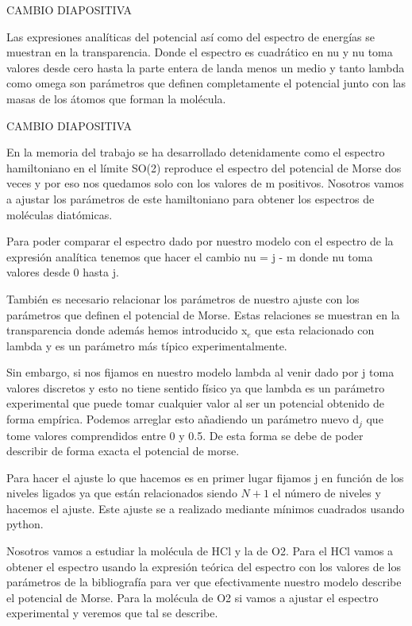 \documentclass[a4paper,12pt,twoside]{article}
\begin{document}
CAMBIO DIAPOSITIVA

Las expresiones analíticas del potencial así como del espectro de energías se muestran en la transparencia. Donde el espectro es cuadrático en nu y nu toma valores desde cero hasta la parte entera de landa menos un medio y tanto lambda como omega son parámetros que definen completamente el potencial junto con las masas de los átomos que forman la molécula.

CAMBIO DIAPOSITIVA

En la memoria del trabajo se ha desarrollado detenidamente como el espectro hamiltoniano en el límite SO(2) reproduce el espectro del potencial de Morse dos veces y por eso nos quedamos solo con los valores de m positivos. Nosotros vamos a ajustar los parámetros de este hamiltoniano para obtener los espectros de moléculas diatómicas.

Para poder comparar el espectro dado por nuestro modelo con el espectro de la expresión analítica tenemos que hacer el cambio nu = j - m donde nu toma valores desde 0 hasta j. 

También es necesario relacionar los parámetros de nuestro ajuste con los parámetros que definen el potencial de Morse. Estas relaciones se muestran en la transparencia donde además hemos introducido x$_e$ que esta relacionado con lambda y es un parámetro más típico experimentalmente.

Sin embargo, si nos fijamos en nuestro modelo lambda al venir dado por j toma valores discretos y esto no tiene sentido físico ya que lambda es un parámetro experimental que puede tomar cualquier valor al ser un potencial obtenido de forma empírica. Podemos arreglar esto añadiendo un parámetro nuevo d$_j$ que tome valores comprendidos entre 0 y 0.5. De esta forma se debe de poder describir de forma exacta el potencial de morse. 

Para hacer el ajuste lo que hacemos es en primer lugar fijamos j en función de los niveles ligados ya que están relacionados siendo $N + 1$ el número de niveles y hacemos el ajuste. Este ajuste se a realizado mediante mínimos cuadrados usando python. 

Nosotros vamos a estudiar la molécula de HCl y la de O2. Para el HCl vamos a obtener el espectro usando la expresión teórica del espectro con los valores de los parámetros de la bibliografía para ver que efectivamente nuestro modelo describe el potencial de Morse. Para la molécula de O2 si vamos a ajustar el espectro experimental y veremos que tal se describe.
\end{document}
